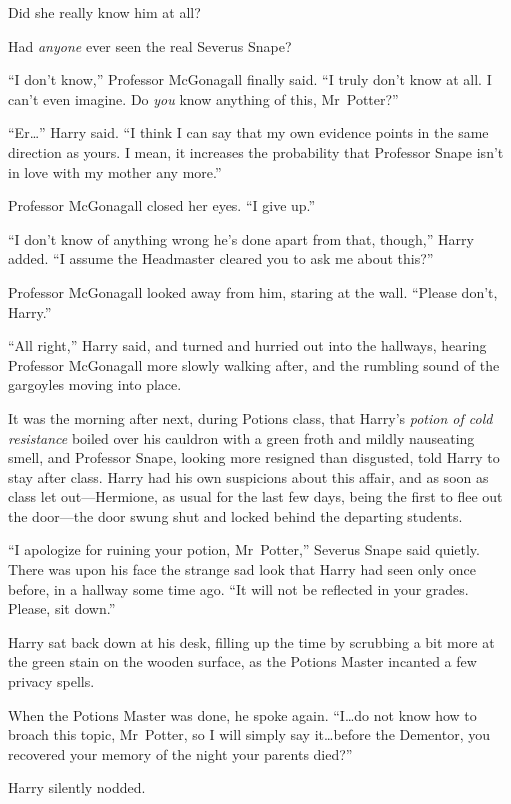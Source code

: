 Did she really know him at all?

Had \emph{anyone} ever seen the real Severus Snape?

\later

“I don’t know,” Professor McGonagall finally said. “I truly don’t know at all. I can’t even imagine. Do \emph{you} know anything of this, Mr~Potter?”

“Er…” Harry said. “I think I can say that my own evidence points in the same direction as yours. I mean, it increases the probability that Professor Snape isn’t in love with my mother any more.”

Professor McGonagall closed her eyes. “I give up.”

“I don’t know of anything wrong he’s done apart from that, though,” Harry added. “I assume the Headmaster cleared you to ask me about this?”

Professor McGonagall looked away from him, staring at the wall. “Please don’t, Harry.”

“All right,” Harry said, and turned and hurried out into the hallways, hearing Professor McGonagall more slowly walking after, and the rumbling sound of the gargoyles moving into place.

\later

It was the morning after next, during Potions class, that Harry’s \emph{potion of cold resistance} boiled over his cauldron with a green froth and mildly nauseating smell, and Professor Snape, looking more resigned than disgusted, told Harry to stay after class. Harry had his own suspicions about this affair, and as soon as class let out—Hermione, as usual for the last few days, being the first to flee out the door—the door swung shut and locked behind the departing students.

“I apologize for ruining your potion, Mr~Potter,” Severus Snape said quietly. There was upon his face the strange sad look that Harry had seen only once before, in a hallway some time ago. “It will not be reflected in your grades. Please, sit down.”

Harry sat back down at his desk, filling up the time by scrubbing a bit more at the green stain on the wooden surface, as the Potions Master incanted a few privacy spells.

When the Potions Master was done, he spoke again. “I…do not know how to broach this topic, Mr~Potter, so I will simply say it…before the Dementor, you recovered your memory of the night your parents died?”

Harry silently nodded.

